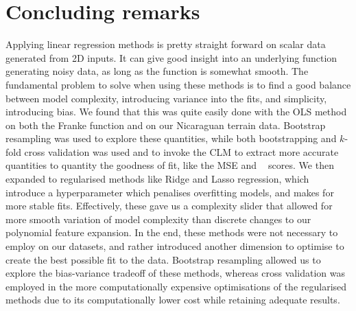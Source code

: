 \documentclass[twocolumn,english,notitlepage]{article}
\DeclareMathOperator{\Rsquared}{R^2}
\begin{document}
\section{Concluding remarks}
    Applying linear regression methods is pretty straight forward on scalar data generated from 2D inputs. It can give good insight into an underlying function generating noisy data, as long as the function is somewhat smooth. The fundamental problem to solve when using these methods is to find a good balance between model complexity, introducing variance into the fits, and simplicity, introducing bias. We found that this was quite easily done with the OLS method on both the Franke function and on our Nicaraguan terrain data. Bootstrap resampling was used to explore these quantities, while both bootstrapping and $k$-fold cross validation was used and to invoke the CLM to extract more accurate quantities to quantity the goodness of fit, like the MSE and $\Rsquared$ scores. We then expanded to regularised methods like Ridge and Lasso regression, which introduce a hyperparameter which penalises overfitting models, and makes for more stable fits. Effectively, these gave us a complexity slider that allowed for more smooth variation of model complexity than discrete changes to our polynomial feature expansion. In the end, these methods were not necessary to employ on our datasets, and rather introduced another dimension to optimise to create the best possible fit to the data. Bootstrap resampling allowed us to explore the bias-variance tradeoff of these methods, whereas cross validation was employed in the more computationally expensive optimisations of the regularised methods due to its computationally lower cost while retaining adequate results.
\end{document}
